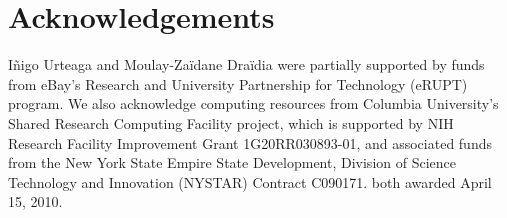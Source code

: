 \documentclass{article}
\begin{document}
\section*{Acknowledgements}
I\~nigo Urteaga and Moulay-Za\"idane Dra\"idia were partially supported
by funds from eBay's Research and University Partnership for Technology (eRUPT) program.
We also acknowledge computing resources from Columbia University’s Shared Research Computing Facility project,
which is supported by NIH Research Facility Improvement Grant 1G20RR030893-01,
and associated funds from the New York State Empire State Development,
Division of Science Technology and Innovation (NYSTAR) Contract C090171.
both awarded April 15, 2010.

%
%


\clearpage
\appendix
\onecolumn

\end{document}
